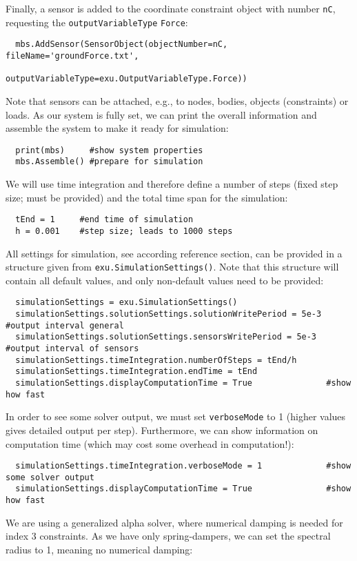 Finally, a sensor is added to the coordinate constraint object with number \texttt{nC}, requesting the \texttt{outputVariableType} \texttt{Force}:
\pythonstyle\begin{lstlisting}
  mbs.AddSensor(SensorObject(objectNumber=nC, fileName='groundForce.txt', 
                             outputVariableType=exu.OutputVariableType.Force))
\end{lstlisting}
Note that sensors can be attached, e.g., to nodes, bodies, objects (constraints) or loads.
%
As our system is fully set, we can print the overall information and assemble the system to make it ready for simulation:
\pythonstyle\begin{lstlisting}
  print(mbs)     #show system properties
  mbs.Assemble() #prepare for simulation
\end{lstlisting}
%
We will use time integration and therefore define a number of steps (fixed step size; must be provided) and the total time span for the simulation:
\pythonstyle\begin{lstlisting}
  tEnd = 1     #end time of simulation
  h = 0.001    #step size; leads to 1000 steps
\end{lstlisting}
%
All settings for simulation, see according reference section, can be provided in a structure given from \texttt{exu.SimulationSettings()}. Note that this structure will contain all default values, and only non-default values need to be provided:
\pythonstyle\begin{lstlisting}
  simulationSettings = exu.SimulationSettings()
  simulationSettings.solutionSettings.solutionWritePeriod = 5e-3 #output interval general
  simulationSettings.solutionSettings.sensorsWritePeriod = 5e-3  #output interval of sensors
  simulationSettings.timeIntegration.numberOfSteps = tEnd/h
  simulationSettings.timeIntegration.endTime = tEnd
  simulationSettings.displayComputationTime = True               #show how fast
\end{lstlisting}
%
In order to see some solver output, we must set \texttt{verboseMode} to 1 (higher values gives detailed output per step).
Furthermore, we can show information on computation time (which may cost some overhead in computation!):
\pythonstyle\begin{lstlisting}
  simulationSettings.timeIntegration.verboseMode = 1             #show some solver output
  simulationSettings.displayComputationTime = True               #show how fast
\end{lstlisting}
We are using a generalized alpha solver, where numerical damping is needed for index 3 constraints. As we have only spring-dampers, we can set the spectral radius to 1, meaning no numerical damping:
